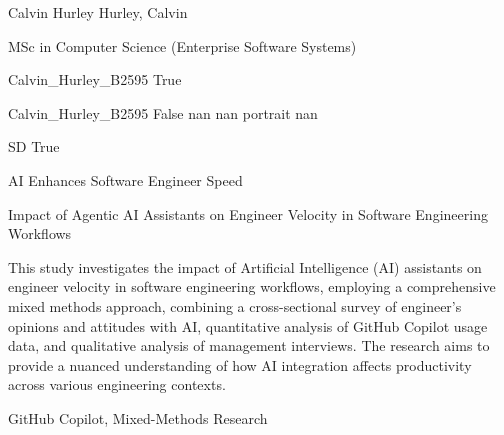 
\begingroup{}\relax



\def\Key{Calvin_Hurley_B2595}

{Calvin Hurley}
{Hurley, Calvin}

{MSc in Computer Science (Enterprise Software Systems)}

{Calvin_Hurley_B2595}
{True}

{Calvin_Hurley_B2595}
{False}
{nan}
{nan}
{portrait}
{nan}

{SD}
{True}

{AI Enhances Software Engineer Speed}

{Impact of Agentic AI Assistants on Engineer Velocity in Software Engineering Workflows}

{This study investigates the impact of Artificial Intelligence (AI) assistants on engineer velocity in software engineering workflows, employing a comprehensive mixed methods approach, combining a cross-sectional survey of engineer's opinions and attitudes with AI, quantitative analysis of GitHub Copilot usage data, and qualitative analysis of management interviews. The research aims to provide a nuanced understanding of how AI integration affects productivity across various engineering contexts.}

{{GitHub Copilot}, Mixed-Methods Research}

